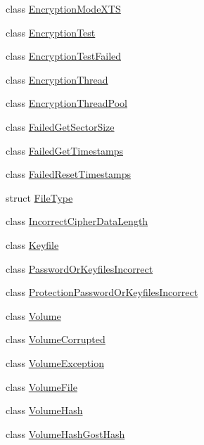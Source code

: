 \begin{DoxyCompactItemize}
\item 
class \hyperlink{class_gost_crypt_1_1_volume_1_1_encryption_mode_x_t_s}{Encryption\+Mode\+X\+TS}
\item 
class \hyperlink{class_gost_crypt_1_1_volume_1_1_encryption_test}{Encryption\+Test}
\item 
class \hyperlink{class_gost_crypt_1_1_volume_1_1_encryption_test_failed}{Encryption\+Test\+Failed}
\item 
class \hyperlink{class_gost_crypt_1_1_volume_1_1_encryption_thread}{Encryption\+Thread}
\item 
class \hyperlink{class_gost_crypt_1_1_volume_1_1_encryption_thread_pool}{Encryption\+Thread\+Pool}
\item 
class \hyperlink{class_gost_crypt_1_1_volume_1_1_failed_get_sector_size}{Failed\+Get\+Sector\+Size}
\item 
class \hyperlink{class_gost_crypt_1_1_volume_1_1_failed_get_timestamps}{Failed\+Get\+Timestamps}
\item 
class \hyperlink{class_gost_crypt_1_1_volume_1_1_failed_reset_timestamps}{Failed\+Reset\+Timestamps}
\item 
struct \hyperlink{struct_gost_crypt_1_1_volume_1_1_file_type}{File\+Type}
\item 
class \hyperlink{class_gost_crypt_1_1_volume_1_1_incorrect_cipher_data_length}{Incorrect\+Cipher\+Data\+Length}
\item 
class \hyperlink{class_gost_crypt_1_1_volume_1_1_keyfile}{Keyfile}
\item 
class \hyperlink{class_gost_crypt_1_1_volume_1_1_password_or_keyfiles_incorrect}{Password\+Or\+Keyfiles\+Incorrect}
\item 
class \hyperlink{class_gost_crypt_1_1_volume_1_1_protection_password_or_keyfiles_incorrect}{Protection\+Password\+Or\+Keyfiles\+Incorrect}
\item 
class \hyperlink{class_gost_crypt_1_1_volume_1_1_volume}{Volume}
\item 
class \hyperlink{class_gost_crypt_1_1_volume_1_1_volume_corrupted}{Volume\+Corrupted}
\item 
class \hyperlink{class_gost_crypt_1_1_volume_1_1_volume_exception}{Volume\+Exception}
\item 
class \hyperlink{class_gost_crypt_1_1_volume_1_1_volume_file}{Volume\+File}
\item 
class \hyperlink{class_gost_crypt_1_1_volume_1_1_volume_hash}{Volume\+Hash}
\item 
class \hyperlink{class_gost_crypt_1_1_volume_1_1_volume_hash_gost_hash}{Volume\+Hash\+Gost\+Hash}

\end{DoxyCompactItemize}
